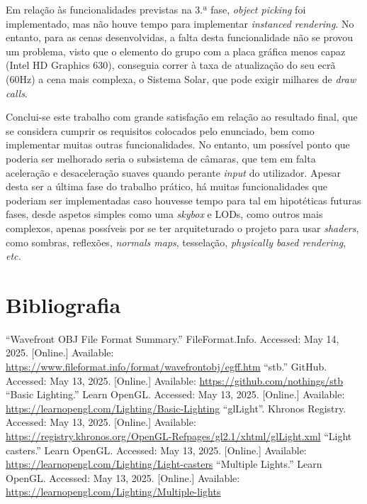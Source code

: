 \documentclass[12pt, a4paper]{article}
\begin{document}
Em relação às funcionalidades previstas na 3.ª fase, \emph{object picking} foi implementado, mas não
houve tempo para implementar \emph{instanced rendering}. No entanto, para as cenas desenvolvidas, a
falta desta funcionalidade não se provou um problema, visto que o elemento do grupo com a placa
gráfica menos capaz (Intel HD Graphics 630), conseguia correr à taxa de atualização do seu ecrã
(60Hz) a cena mais complexa, o Sistema Solar, que pode exigir milhares de \emph{draw calls}.

Conclui-se este trabalho com grande satisfação em relação ao resultado final, que se considera
cumprir os requisitos colocados pelo enunciado, bem como implementar muitas outras funcionalidades.
No entanto, um possível ponto que poderia ser melhorado seria o subsistema de câmaras, que tem em
falta aceleração e desaceleração suaves quando perante \emph{input} do utilizador. Apesar desta ser
a última fase do trabalho prático, há muitas funcionalidades que poderiam ser implementadas caso
houvesse tempo para tal em hipotéticas futuras fases, desde aspetos simples como uma \emph{skybox} e
LODs, como outros mais complexos, apenas possíveis por se ter arquiteturado o projeto para usar
\emph{shaders}, como sombras, reflexões, \emph{normals maps}, tesselação, \emph{physically based
rendering}, \emph{etc.}

\begingroup
\section{Bibliografia}
\renewcommand{\section}[2]{}

\begin{thebibliography}{9}
        ``Wavefront OBJ File Format Summary.''{} FileFormat.Info. Accessed: May 14, 2025. [Online.]
        Available: \url{https://www.fileformat.info/format/wavefrontobj/egff.htm}
        ``stb.'' GitHub. Accessed: May 13, 2025. [Online.] Available:
        \url{https://github.com/nothings/stb}
        ``Basic Lighting.'' Learn OpenGL. Accessed: May 13, 2025. [Online.] Available:
        \url{https://learnopengl.com/Lighting/Basic-Lighting}
        ``glLight''. Khronos Registry. Accessed: May 13, 2025. [Online.] Available:
        \url{https://registry.khronos.org/OpenGL-Refpages/gl2.1/xhtml/glLight.xml}
        ``Light casters.'' Learn OpenGL. Accessed: May 13, 2025. [Online.] Available:
        \url{https://learnopengl.com/Lighting/Light-casters}
        ``Multiple Lights.'' Learn OpenGL. Accessed: May 13, 2025. [Online.] Available:
        \url{https://learnopengl.com/Lighting/Multiple-lights}
\end{thebibliography}
\endgroup
\end{document}
